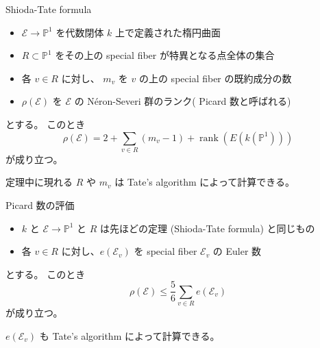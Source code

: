 \documentclass{classes/mybeamer}
\DeclareMathOperator{\rank}{rank}
\newcommand{\Neron}{N\'eron}
\begin{document}
\begin{frame}{Shioda-Tate formula}
    \begin{thm}
        \label{thm:shioda}
        \begin{itemize}
            \item $\mathcal{E} \to \mathbb{P}^1$ を代数閉体 $k$ 上で定義された楕円曲面
            \item $R \subset \mathbb{P}^1$ をその上の special fiber が特異となる点全体の集合
            \item 各 $v \in R$ に対し、 $m_{v}$ を $v$ の上の special fiber の既約成分の数
            \item $\rho(\mathcal{E})$ を $\mathcal{E}$ の \Neron-Severi 群のランク( Picard 数と呼ばれる)
        \end{itemize}
        とする。
        このとき
        \begin{equation*}
            \rho (\mathcal{E}) = 2 + \sum_{v \in R} (m_{v} - 1) + \rank(E(k(\mathbb{P}^1)))
        \end{equation*}
        が成り立つ。
    \end{thm}
    定理中に現れる $R$ や $m_v$ は Tate's algorithm によって計算できる。
\end{frame}

\begin{frame}{Picard 数の評価}
    \begin{proposition}
        \begin{itemize}
            \item $k$ と $\mathcal{E} \to \mathbb{P}^1$ と $R$ は先ほどの定理 (Shioda-Tate formula) と同じもの
            \item 各 $v \in R$ に対し、$e(\mathcal{E}_v)$ を special fiber $\mathcal{E}_v$ の Euler 数
        \end{itemize}
        とする。
        このとき
        \begin{equation*}
            \rho(\mathcal{E}) \leq \frac{5}{6} \sum_{v \in R} e(\mathcal{E}_v)
        \end{equation*}
        が成り立つ。
    \end{proposition}
    $e(\mathcal{E}_v)$ も Tate's algorithm によって計算できる。
\end{frame}
\end{document}
